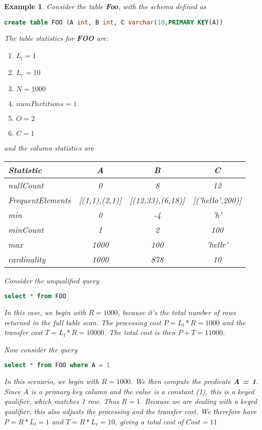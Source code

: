 \documentclass[10pt]{amsart}
\newtheorem{exmp}{Example}[section]
\begin{document}
\begin{exmp}
				Consider the table \textbf{Foo}, with the schema defined as
				\begin{lstlisting}[frame=single,language=SQL]
create table FOO (A int, B int, C varchar(10,PRIMARY KEY(A))
				\end{lstlisting}
				The table statistics for \textbf{FOO} are:
				\begin{enumerate}
\item $L_l = 1$
\item $L_r = 10$
\item $N = 1000$
\item $numPartitions = 1$
\item $O = 2$
\item $C = 1$
				\end{enumerate}
and the column statistics are
\begin{table}
				\begin{tabular}{|l|c|c|c|}
				\hline
				Statistic	&	A	&	B	&	C \\ \hline
				nullCount					& 0							&	8									&	12 \\ \hline
				FrequentElements	&	[(1,1),(2,1)]	&	[(12,33),(6,18)]	&	[('hello',200)] \\ \hline
				min								&	0							&	-4								&	'h' \\ \hline
				minCount					&	1							&	2									&	100 \\ \hline
				max								&	1000					&	100								&	'hellr' \\ \hline
				cardinality				&	1000					&	878								& 10
				\end{tabular}
\end{table}
Consider the unqualified query
				\begin{lstlisting}[frame=single,language=SQL]
select * from FOO
				\end{lstlisting}
In this case, we begin with $R= 1000$, because it's the total number of rows returned in the full table scan. The processing cost $P = L_l*R = 1000$ and the transfer cost $T = L_l*R = 10000$. The total cost is then $P+T = 11000$. 

Now consider the query
\begin{lstlisting}[frame=single,language=SQL]
select * from FOO where A = 1
\end{lstlisting}
In this scenario, we begin with $R=1000$. We then compute the predicate \textbf{A = 1}. Since $A$ is a primary key column and the value is a constant (1), this is a keyed qualifier, which matches 1 row. Thus $R=1$. Because we are dealing with a keyed qualifier, this also adjusts the processing and the transfer cost. We therefore have $P = R*L_l = 1$ and $T = R*L_r = 10$, giving a total cost of $Cost = 11$


\end{exmp}
\end{document}
